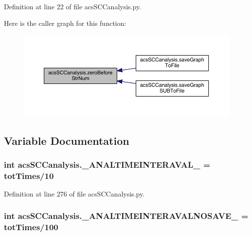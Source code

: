 Definition at line 22 of file acs\-S\-C\-Canalysis.\-py.



Here is the caller graph for this function\-:
\nopagebreak
\begin{figure}[H]
\begin{center}
\leavevmode
\includegraphics[width=350pt]{a00128_ab46df2a2027edcf1b07fc012b691b9d6_icgraph}
\end{center}
\end{figure}




\subsection{Variable Documentation}
\hypertarget{a00128_a46f1fb71bdcdb1c8679ae847d0d4b63f}{
\subsubsection[{\-\_\-\-A\-N\-A\-L\-T\-I\-M\-E\-I\-N\-T\-E\-R\-A\-V\-A\-L\-\_\-}]{\setlength{\rightskip}{0pt plus 5cm}int acs\-S\-C\-Canalysis.\-\_\-\-A\-N\-A\-L\-T\-I\-M\-E\-I\-N\-T\-E\-R\-A\-V\-A\-L\-\_\- = {\bf tot\-Times}/10}}\label{a00128_a46f1fb71bdcdb1c8679ae847d0d4b63f}


Definition at line 276 of file acs\-S\-C\-Canalysis.\-py.

\hypertarget{a00128_a7665e828ed7f27f4ba353e9645ad716d}{
\subsubsection[{\-\_\-\-A\-N\-A\-L\-T\-I\-M\-E\-I\-N\-T\-E\-R\-A\-V\-A\-L\-N\-O\-S\-A\-V\-E\-\_\-}]{\setlength{\rightskip}{0pt plus 5cm}int acs\-S\-C\-Canalysis.\-\_\-\-A\-N\-A\-L\-T\-I\-M\-E\-I\-N\-T\-E\-R\-A\-V\-A\-L\-N\-O\-S\-A\-V\-E\-\_\- = {\bf tot\-Times}/100}}\label{a00128_a7665e828ed7f27f4ba353e9645ad716d}


